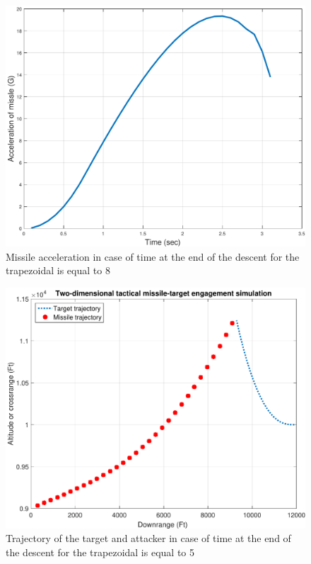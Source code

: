 \begin{figure}[htb]
	\centering
	\includegraphics[scale = 0.75]{fig/MissileAccelerationT1.pdf}
	\caption{Missile acceleration in case of time at the end of the descent for the trapezoidal is equal to 8 }
	\label{missile accelerationT1}
\end{figure}

\begin{figure}[htb]
	\centering
	\includegraphics[scale = 0.75]{fig/trajectoryT2.pdf}
	\caption{Trajectory of the target and attacker in case of time at the end of the descent for the trapezoidal is equal to 5 }
	\label{trajectoryT2}
\end{figure}


